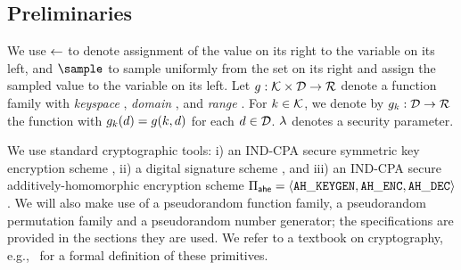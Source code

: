\subsection{Preliminaries}
\label{sec:def}
%


%
We use $\gets$ to denote assignment of the value on its right to
the variable on its left, and $\sample$ to sample uniformly from the
set on its right and assign the sampled value to the variable on its
left.  Let $\genericFnFamily: \genericFnKeyspace \times
\genericFnDomain \rightarrow \genericFnRange$ denote a function family
with \textit{keyspace} \genericFnKeyspace, \textit{domain}
\genericFnDomain, and \textit{range} \genericFnRange.  For
$\genericFnKey \in \genericFnKeyspace$, we denote by
$\genericFnFamily[\genericFnKey]: \genericFnDomain \rightarrow
\genericFnRange$ the function with
$\genericFnFamily[\genericFnKey](\genericFnDomainElmt) =
\genericFnFamily(\genericFnKey, \genericFnDomainElmt)$ for each
$\genericFnDomainElmt \in \genericFnDomain$. $\lambda$  
denotes a security parameter. 


%
We use standard cryptographic tools: i) an IND-CPA secure symmetric key encryption scheme \encryptionSchemeDefn, ii) a digital signature scheme \sigSchemeDefn, and iii) an IND-CPA secure additively-homomorphic encryption scheme $\ahencryptionSchemeDefn$. We will also make use of a pseudorandom function family, a pseudorandom permutation family and a pseudorandom number generator; the specifications are provided in the sections they are used. We refer to a textbook on cryptography, e.g.,~\cite{katz2007introduction} for a formal definition of these primitives. 

